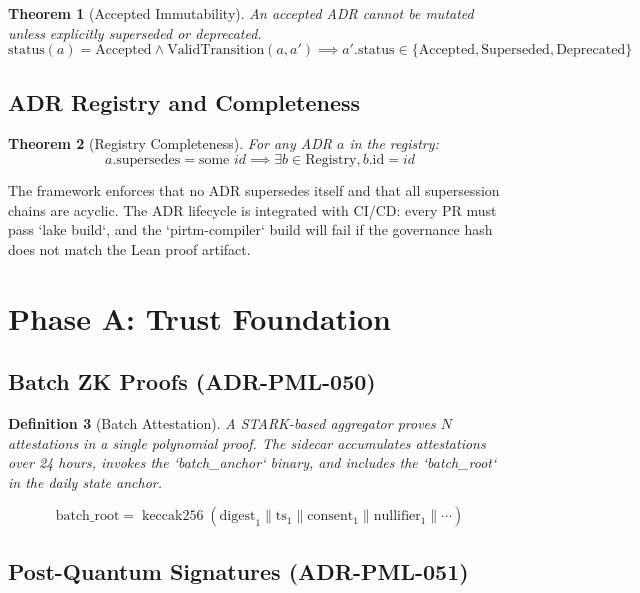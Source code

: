 \documentclass[11pt,a4paper]{article}
\newtheorem{theorem}{Theorem}[section]
\newtheorem{definition}[theorem]{Definition}
\DeclareMathOperator{\keccak}{keccak256}
\begin{document}
\begin{theorem}[Accepted Immutability]
An accepted ADR cannot be mutated unless explicitly superseded or deprecated.
\[
\text{status}(a) = \text{Accepted} \land \text{ValidTransition}(a, a') \implies
a'.\text{status} \in \{\text{Accepted}, \text{Superseded}, \text{Deprecated}\}
\]
\end{theorem}

\subsection{ADR Registry and Completeness}

\begin{theorem}[Registry Completeness]
For any ADR $a$ in the registry:
\[
a.\text{supersedes} = \text{some } id \implies \exists b \in \text{Registry}, b.\text{id} = id
\]
\end{theorem}

The framework enforces that no ADR supersedes itself and that all supersession chains are acyclic. The ADR lifecycle is integrated with CI/CD: every PR must pass `lake build`, and the `pirtm-compiler` build will fail if the governance hash does not match the Lean proof artifact.

\section{Phase A: Trust Foundation}

\subsection{Batch ZK Proofs (ADR-PML-050)}

\begin{definition}[Batch Attestation]
A STARK-based aggregator proves $N$ attestations in a single polynomial proof. The sidecar accumulates attestations over 24 hours, invokes the `batch_anchor` binary, and includes the `batch_root` in the daily state anchor.
\end{definition}

\begin{equation}
    \text{batch\_root} = \keccak(\text{digest}_1 \| \text{ts}_1 \| \text{consent}_1 \| \text{nullifier}_1 \| \cdots)
\end{equation}

\subsection{Post-Quantum Signatures (ADR-PML-051)}
\end{document}

